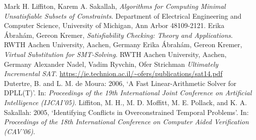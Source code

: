 \begin{thebibliography}{9}
Mark H. Liffiton, Karem A. Sakallah,
\textit{Algorithms for Computing Minimal Unsatisfiable Subsets of Constraints}.
Department of Electrical Engineering and Computer Science,
University of Michigan, Ann Arbor 48109-2121.
Erika \'{A}brah\'{a}m,  Gereon Kremer,
\textit{Satisfiability Checking: Theory and Applications}.
RWTH Aachen University, Aachen, Germany
Erika \'{A}brah\'{a}m,  Gereon Kremer,
\textit{Virtual Substitution for SMT-Solving}.
RWTH Aachen University, Aachen, Germany
Alexander Nadel, Vadim Ryvchin, Ofer Strichman
\textit{Ultimately Incremental SAT}.
\url{https://ie.technion.ac.il/~ofers/publications/sat14.pdf}
Dutertre, B. and L. M. de Moura: 2006, ‘A Fast Linear-Arithmetic Solver for
DPLL(T)’. In: \textit{Proceedings of the 19th International Joint Conference on Artificial Intelligence (IJCAI’05)}.
Liffiton, M. H., M. D. Moffitt, M. E. Pollack, and K. A. Sakallah: 2005, ‘Identifying
Conflicts in Overconstrained Temporal Problems’. In: \textit{Proceedings of the 18th International Conference on Computer Aided Verification (CAV’06)}.
\end{thebibliography}